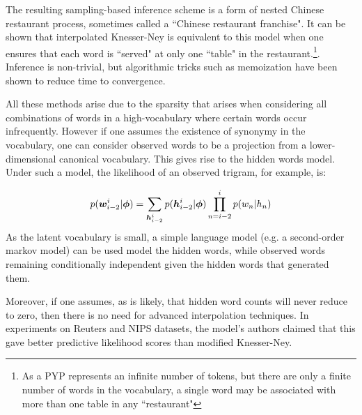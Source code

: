 The resulting sampling-based inference scheme is a form of nested Chinese restaurant process, sometimes called a ``Chinese restaurant franchise". It can be shown that interpolated Knesser-Ney is equivalent to this model when one ensures that each word is ``served" at only one ``table" in the restaurant.\footnote{As a PYP represents an infinite number of tokens, but there are only a finite number of words in the vocabulary, a single word may be associated with more than one table in any ``restaurant"}. Inference is non-trivial, but algorithmic tricks such as memoization have been shown\cite{Wood2011} to reduce time to convergence.

All these methods arise due to the sparsity that arises when considering all combinations of words in a high-vocabulary where certain words occur infrequently. However if one assumes the existence of synonymy in the vocabulary, one can consider observed words to be a projection from a lower-dimensional canonical vocabulary. This gives rise to the hidden words model\cite{Deschacht2012}. Under such a model, the likelihood of an observed trigram, for example, is:

\begin{align}
p(\bm w^i_{i-2}|\bm \phi) = \sum_{\bm h^i_{i-2}} p(\bm h^i_{i-2}|\bm \phi) \prod_{n=i-2}^i p(w_n | h_n)
\end{align}
As the latent vocabulary is small, a simple language model (e.g. a second-order markov model) can be used model the hidden words, while observed words remaining conditionally independent given the hidden words that generated them. 
 
Moreover, if one assumes, as is likely, that hidden word counts will never reduce to zero, then there is no need for advanced interpolation techniques. In experiments on Reuters and NIPS datasets, the model's authors claimed that this gave better predictive likelihood scores than modified Knesser-Ney.


